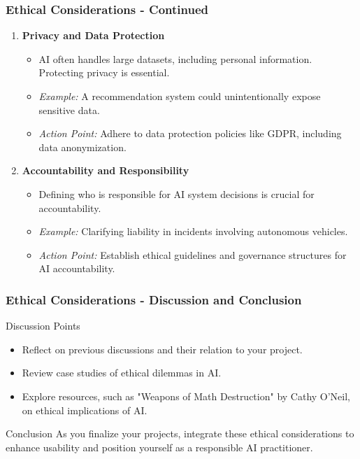 \documentclass[aspectratio=169]{beamer}
\begin{document}
\begin{frame}[fragile]
    \frametitle{Ethical Considerations - Continued}
    \begin{enumerate}[resume]
        \item \textbf{Privacy and Data Protection}
            \begin{itemize}
                \item AI often handles large datasets, including personal information. Protecting privacy is essential.
                \item \textit{Example:} A recommendation system could unintentionally expose sensitive data.
                \item \textit{Action Point:} Adhere to data protection policies like GDPR, including data anonymization.
            \end{itemize}
        
        \item \textbf{Accountability and Responsibility}
            \begin{itemize}
                \item Defining who is responsible for AI system decisions is crucial for accountability.
                \item \textit{Example:} Clarifying liability in incidents involving autonomous vehicles.
                \item \textit{Action Point:} Establish ethical guidelines and governance structures for AI accountability.
            \end{itemize}
    \end{enumerate}
\end{frame}

\begin{frame}[fragile]
    \frametitle{Ethical Considerations - Discussion and Conclusion}
    \begin{block}{Discussion Points}
        \begin{itemize}
            \item Reflect on previous discussions and their relation to your project.
            \item Review case studies of ethical dilemmas in AI.
            \item Explore resources, such as "Weapons of Math Destruction" by Cathy O’Neil, on ethical implications of AI.
        \end{itemize}
    \end{block}
    
    \begin{block}{Conclusion}
        As you finalize your projects, integrate these ethical considerations to enhance usability and position yourself as a responsible AI practitioner.
    \end{block}
\end{frame}
\end{document}
